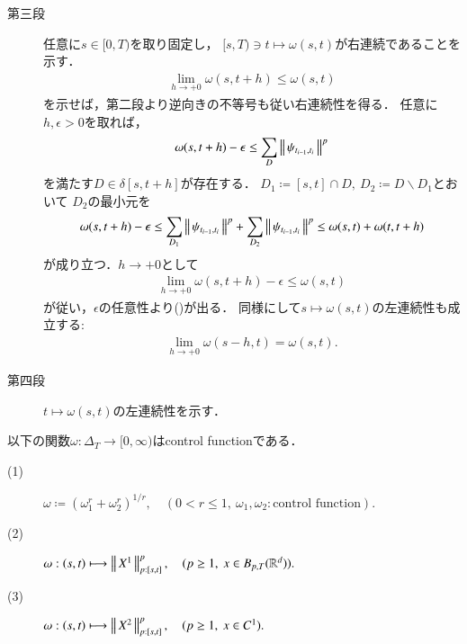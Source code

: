 \begin{prf}
\begin{description}
			\item[第三段]
				任意に$s \in [0,T)$を取り固定し，
				$[s,T) \ni t \longmapsto \omega(s,t)$が右連続であることを示す．
				\begin{align}
					\lim_{h \to +0} \omega(s,t+h) \leq \omega(s,t)
					\label{eq:thm_continuity_of_norm_val_p_variation_3}
				\end{align}
				を示せば，第二段より逆向きの不等号も従い右連続性を得る．
				任意に$h,\epsilon > 0$を取れば，
				\begin{align}
					\omega(s,t + h) - \epsilon
					\leq \sum_D \left\|\, \psi_{t_{i-1},t_i}\, \right\|_{}^p
				\end{align}
				を満たす$D \in \delta[s,t+h]$が存在する．
				$D_1 \coloneqq [s,t] \cap D,\ D_2 \coloneqq D \backslash D_1$とおいて
				$D_2$の最小元を
				\begin{align}
					\omega(s,t + h) - \epsilon
					\leq \sum_{D_1} \left\|\, \psi_{t_{i-1},t_i}\, \right\|_{}^p + \sum_{D_2} \left\|\, \psi_{t_{i-1},t_i}\, \right\|_{}^p
					\leq \omega(s,t) + \omega(t,t+h)
				\end{align}
				が成り立つ．$h \longrightarrow +0$として
				\begin{align}
					\lim_{h \to +0} \omega(s,t+h) - \epsilon \leq \omega(s,t)
				\end{align}
				が従い，$\epsilon$の任意性より()が出る．
				同様にして$s \longmapsto \omega(s,t)$の左連続性も成立する:
				\begin{align}
					\lim_{h \to +0} \omega(s-h,t) = \omega(s,t).
				\end{align}
			
			\item[第四段]
				$t \longmapsto \omega(s,t)$の左連続性を示す．
		\end{description}
	\end{prf}
	
	\begin{screen}
		\begin{thm}\label{thm:examples_of_control_functions}
			以下の関数$\omega:\Delta_T \longrightarrow [0,\infty)$はcontrol functionである．
			\begin{description}
				\item[(1)] $\omega \coloneqq \left( \omega_1^r + \omega_2^r \right)^{1/r},
					\quad (0 < r \leq 1,\ \omega_1,\omega_2:\mbox{control function}).$
				\item[(2)] $\omega:(s,t) \longmapsto \left\|\, X^1\, \right\|_{p:[s,t]}^p,
					\quad (p \geq 1,\ x \in B_{p,T}(\mathbb{R}^d)).$
				\item[(3)] $\omega:(s,t) \longmapsto \left\|\, X^2\, \right\|_{p:[s,t]}^p,
					\quad (p \geq 1,\ x \in C^1).$
			\end{description}
		\end{thm}
	\end{screen}
	
